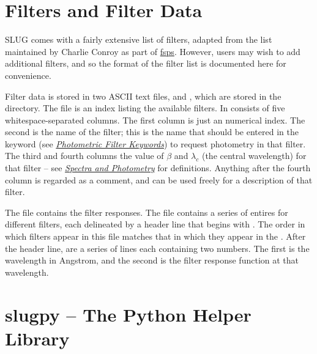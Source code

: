 \documentclass[letterpaper,10pt,english]{sphinxmanual}
\begin{document}
\chapter{Filters and Filter Data}
\label{filters:sec-filters}\label{filters::doc}\label{filters:filters-and-filter-data}
SLUG comes with a fairly extensive list of filters, adapted from the list maintained by Charlie Conroy as part of \href{https://code.google.com/p/fsps/}{fsps}. However, users may wish to add additional filters, and so the format of the filter list is documented here for convenience.

Filter data is stored in two ASCII text files,  and , which are stored in the  directory. The  file is an index listing the available filters. In consists of five whitespace-separated columns. The first column is just an numerical index. The second is the name of the filter; this is the name that should be entered in the  keyword (see {\hyperref[parameters:ssec-phot-keywords]{\emph{Photometric Filter Keywords}}}) to request photometry in that filter. The third and fourth columns the value of \(\beta\) and \(\lambda_c\) (the central wavelength) for that filter -- see {\hyperref[intro:ssec-spec-phot]{\emph{Spectra and Photometry}}} for definitions. Anything after the fourth column is regarded as a comment, and can be used freely for a description of that filter.

The  file contains the filter responses. The file contains a series of entires for different filters, each delineated by a header line that begins with \code{\#}. The order in which filters appear in this file matches that in which they appear in the . After the header line, are a series of lines each containing two numbers. The first is the wavelength in Angstrom, and the second is the filter response function at that wavelength.


\chapter{slugpy -- The Python Helper Library}
\label{slugpy:slugpy-the-python-helper-library}\label{slugpy:sec-slugpy}\label{slugpy::doc}
\end{document}
